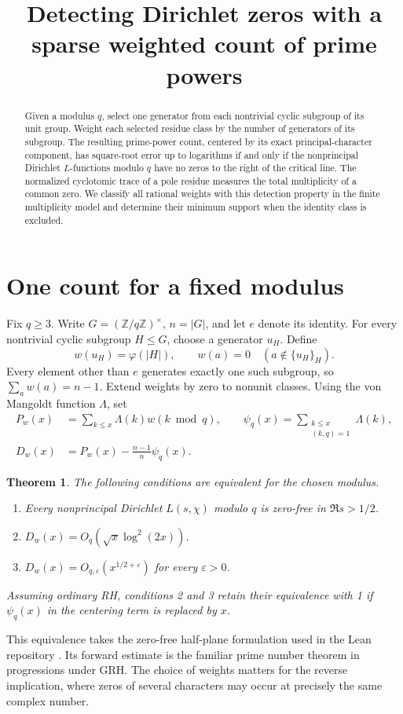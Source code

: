 \documentclass[11pt]{article}
\title{Detecting Dirichlet zeros with a sparse weighted count of prime powers}
\author{}\date{}
\newtheorem{thm}{Theorem}
\newcommand{\pn}{\psi_q}
\begin{document}
\maketitle\vspace{-3.8em}
\begin{abstract}
Given a modulus $q$, select one generator from each nontrivial cyclic subgroup of its unit group. Weight each selected residue class by the number of generators of its subgroup. The resulting prime-power count, centered by its exact principal-character component, has square-root error up to logarithms if and only if the nonprincipal Dirichlet $L$-functions modulo $q$ have no zeros to the right of the critical line. The normalized cyclotomic trace of a pole residue measures the total multiplicity of a common zero. We classify all rational weights with this detection property in the finite multiplicity model and determine their minimum support when the identity class is excluded.
\end{abstract}

\section{One count for a fixed modulus}
Fix $q\ge3$. Write $G=(\mathbb Z/q\mathbb Z)^\times$, $n=|G|$, and let $e$ denote its identity. For every nontrivial cyclic subgroup $H\le G$, choose a generator $u_H$. Define
\[
 w(u_H)=\varphi(|H|),\qquad w(a)=0\quad(a\notin\{u_H\}_H).
\]
Every element other than $e$ generates exactly one such subgroup, so $\sum_a w(a)=n-1$. Extend weights by zero to nonunit classes. Using the von Mangoldt function $\Lambda$, set
\begin{align*}
 P_w(x)&=\sum_{k\le x}\Lambda(k)w(k\bmod q),\qquad
 \pn(x)=\sum_{\substack{k\le x\\(k,q)=1}}\Lambda(k),\\
 D_w(x)&=P_w(x)-\frac{n-1}{n}\pn(x).
\end{align*}
\begin{thm}\label{analytic}
The following conditions are equivalent for the chosen modulus.
\begin{enumerate}
\item Every nonprincipal Dirichlet $L(s,\chi)$ modulo $q$ is zero-free in $\Re s>1/2$.
\item $D_w(x)=O_q(\sqrt{x}\log^2(2x))$.
\item $D_w(x)=O_{q,\varepsilon}(x^{1/2+\varepsilon})$ for every $\varepsilon>0$.
\end{enumerate}
Assuming ordinary RH, conditions 2 and 3 retain their equivalence with 1 if $\pn(x)$ in the centering term is replaced by $x$.
\end{thm}
This equivalence takes the zero-free half-plane formulation used in the Lean repository \cite{lean}. Its forward estimate is the familiar prime number theorem in progressions under GRH. The choice of weights matters for the reverse implication, where zeros of several characters may occur at precisely the same complex number.
\end{document}
